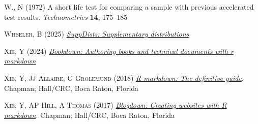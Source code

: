 \documentclass[
  letterpaper,
  DIV=11,
  numbers=noendperiod]{scrreprt}
\newlength{\cslhangindent}
\newenvironment{CSLReferences}[2] %
 {\begin{list}{}{%
  \setlength{\itemindent}{0pt}
  \setlength{\leftmargin}{0pt}
  \setlength{\parsep}{0pt}
  \ifodd #1
   \setlength{\leftmargin}{\cslhangindent}
   \setlength{\itemindent}{-1\cslhangindent}
  \fi
  \setlength{\itemsep}{#2\baselineskip}}}
 {\end{list}}
\begin{document}
\begin{CSLReferences}{1}{0}
\textsc{W., N} (1972) A short life test for comparing a sample with
previous accelerated test results. \emph{Technometrics} \textbf{14},
175--185

\textsc{Wheeler, B} (2025)
\emph{\href{https://CRAN.R-project.org/package=SuppDists}{SuppDists:
Supplementary distributions}}

\textsc{Xie, Y} (2024)
\emph{\href{https://github.com/rstudio/bookdown}{Bookdown: Authoring
books and technical documents with r markdown}}

\textsc{Xie, Y, JJ Allaire, G Grolemund} (2018)
\emph{\href{https://bookdown.org/yihui/rmarkdown}{R markdown: The
definitive guide}}. Chapman; Hall/CRC, Boca Raton, Florida

\textsc{Xie, Y, AP Hill, A Thomas} (2017)
\emph{\href{https://bookdown.org/yihui/blogdown/}{Blogdown: Creating
websites with {R} markdown}}. Chapman; Hall/CRC, Boca Raton, Florida

\end{CSLReferences}
\end{document}
